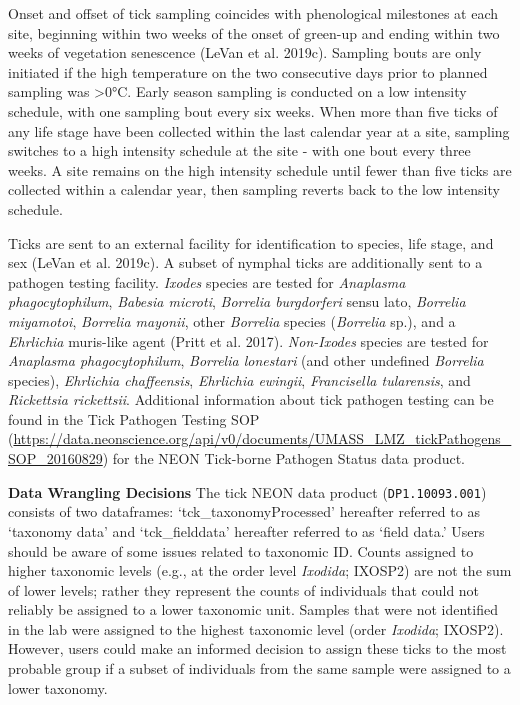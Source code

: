 \documentclass[
  12pt,
]{article}
\begin{document}
Onset and offset of tick sampling coincides with phenological milestones at each site, beginning within two weeks of the onset of green-up and ending within two weeks of vegetation senescence (LeVan et al. 2019c). Sampling bouts are only initiated if the high temperature on the two consecutive days prior to planned sampling was \textgreater0°C. Early season sampling is conducted on a low intensity schedule, with one sampling bout every six weeks. When more than five ticks of any life stage have been collected within the last calendar year at a site, sampling switches to a high intensity schedule at the site - with one bout every three weeks. A site remains on the high intensity schedule until fewer than five ticks are collected within a calendar year, then sampling reverts back to the low intensity schedule.

Ticks are sent to an external facility for identification to species, life stage, and sex (LeVan et al. 2019c). A subset of nymphal ticks are additionally sent to a pathogen testing facility. \emph{Ixodes} species are tested for \emph{Anaplasma phagocytophilum}, \emph{Babesia microti}, \emph{Borrelia burgdorferi} sensu lato, \emph{Borrelia miyamotoi}, \emph{Borrelia mayonii}, other \emph{Borrelia} species (\emph{Borrelia} sp.), and a \emph{Ehrlichia} muris-like agent (Pritt et al. 2017). \emph{Non-Ixodes} species are tested for \emph{Anaplasma phagocytophilum}, \emph{Borrelia lonestari} (and other undefined \emph{Borrelia} species), \emph{Ehrlichia chaffeensis}, \emph{Ehrlichia ewingii}, \emph{Francisella tularensis}, and \emph{Rickettsia rickettsii}. Additional information about tick pathogen testing can be found in the Tick Pathogen Testing SOP (\url{https://data.neonscience.org/api/v0/documents/UMASS_LMZ_tickPathogens_SOP_20160829}) for the NEON Tick-borne Pathogen Status data product.

\textbf{Data Wrangling Decisions} The tick NEON data product (\texttt{DP1.10093.001}) consists of two dataframes: `tck\_taxonomyProcessed' hereafter referred to as `taxonomy data' and `tck\_fielddata' hereafter referred to as `field data.' Users should be aware of some issues related to taxonomic ID. Counts assigned to higher taxonomic levels (e.g., at the order level \emph{Ixodida}; IXOSP2) are not the sum of lower levels; rather they represent the counts of individuals that could not reliably be assigned to a lower taxonomic unit. Samples that were not identified in the lab were assigned to the highest taxonomic level (order \emph{Ixodida}; IXOSP2). However, users could make an informed decision to assign these ticks to the most probable group if a subset of individuals from the same sample were assigned to a lower taxonomy.
\end{document}
